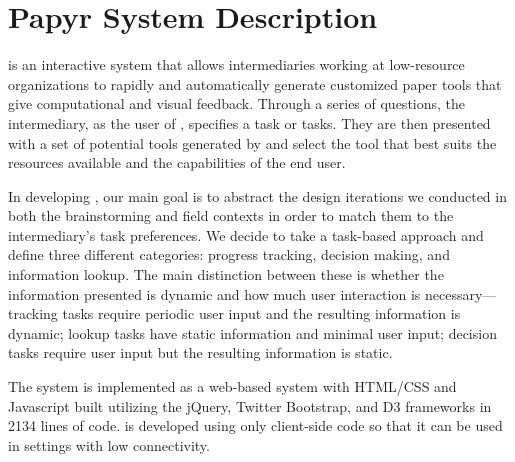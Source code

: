 \documentclass{sig-alternate}
\begin{document}
\section{Papyr System Description}
\label{sec:system-desc}

\nifty is an interactive system that allows intermediaries working at low-resource organizations to rapidly and automatically generate customized paper tools that give computational and visual feedback. Through a series of questions, the intermediary, as the user of \nifty, specifies a task or tasks. They are then presented with a set of potential tools generated by \nifty and select the tool that best suits the resources available and the capabilities of the end user. 

In developing \nifty, our main goal is to abstract the design iterations we conducted in both the brainstorming and field contexts in order to match them to the intermediary's task preferences. We decide to take a task-based approach and define three different categories: progress tracking, decision making, and information lookup. The main distinction between these is whether the information presented is dynamic and how much user interaction is necessary---tracking tasks require periodic user input and the resulting information is dynamic; lookup tasks have static information and minimal user input; decision tasks require user input but the resulting information is static.

The system is implemented as a web-based system with HTML/CSS and Javascript built utilizing the jQuery, Twitter Bootstrap, and D3 frameworks in 2134 lines of code. \nifty is developed using only client-side code so that it can be used in settings with low connectivity.

\end{document}
